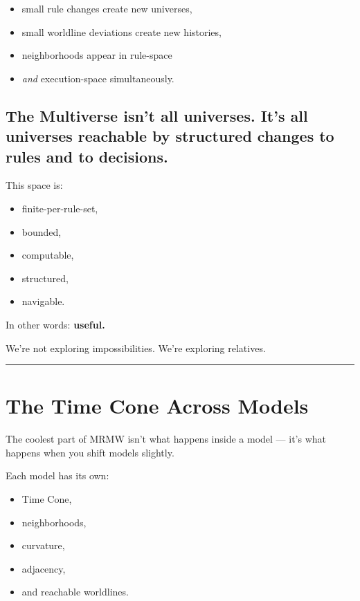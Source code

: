 \begin{itemize}
\tightlist
\item
  small rule changes create new universes,
\item
  small worldline deviations create new histories,
\item
  neighborhoods appear in rule-space
\item
  \emph{and} execution-space simultaneously.
\end{itemize}

\subsection{\texorpdfstring{\textbf{The Multiverse isn't all
universes. It's all universes reachable by structured changes to rules
and to
decisions.}}{The Multiverse isn't all universes. It's all universes reachable by structured changes to rules and to decisions.}}\label{the-multiverse-isnt-all-universes.-its-all-universes-reachable-by-structured-changes-to-rules-and-to-decisions.}

This space is:

\begin{itemize}
\tightlist
\item
  finite-per-rule-set,\\
\item
  bounded,
\item
  computable,
\item
  structured,
\item
  navigable.
\end{itemize}

In other words: \textbf{useful.}

We're not exploring impossibilities. We're exploring relatives.

\begin{center}\rule{0.5\linewidth}{0.5pt}\end{center}

\section{\texorpdfstring{\textbf{The Time Cone Across
Models}}{8.4 --- The Time Cone Across Models}}\label{the-time-cube-across-models}

The coolest part of MRMW isn't what happens inside a model --- it's what
happens when you shift models slightly.

Each model has its own:

\begin{itemize}
\tightlist
\item
  Time Cone,\\
\item
  neighborhoods,
\item
  curvature,
\item
  adjacency,
\item
  and reachable worldlines.
\end{itemize}

